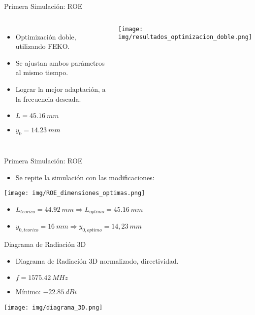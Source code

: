 \begin{frame}{Primera Simulación: ROE}
    \begin{columns}
             \begin{itemize}
                \item Optimización doble, utilizando FEKO.
                \item Se ajustan ambos parámetros al mismo tiempo.
                \item Lograr la mejor adaptación, a la frecuencia deseada.
                \item<2-> $L = 45.16 \ mm$
                \item<2-> $y_0 = 14.23 \ mm$
            \end{itemize}
            \texttt{[image: img/resultados\_optimizacion\_doble.png]}
    \end{columns}
\end{frame}

\begin{frame}{Primera Simulación: ROE}
\begin{itemize}
    \item<1-> Se repite la simulación con las modificaciones:
\end{itemize}
    \begin{center}
        \texttt{[image: img/ROE\_dimensiones\_optimas.png]}
    \end{center}

    \begin{itemize}
        \item<3-> $L_{teorico} = 44.92 \ mm \Rightarrow L_{optimo} = 45.16 \ mm$
        \item<4-> $y_{0,teorico} = 16 \ mm \Rightarrow y_{0,optimo} = 14,23 \ mm$
    \end{itemize}
\end{frame}

\begin{frame}{Diagrama de Radiación 3D}
\begin{itemize}
    \item<1-> Diagrama de Radiación 3D normalizado, directividad.
    \item<2-> $f = 1575.42 \ MHz$
    \item<3-> Mínimo: $-22.85 \ dBi$
\end{itemize}
    \begin{center}
        \texttt{[image: img/diagrama\_3D.png]}
    \end{center}
\end{frame}

